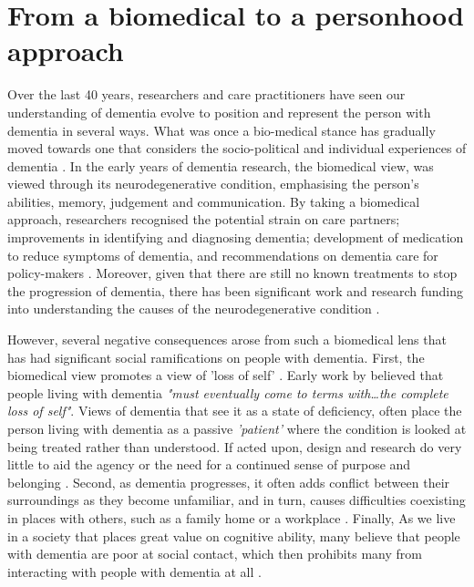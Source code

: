 \section{From a biomedical to a personhood approach}
\label{BL:DementiaHCI}
Over the last 40 years, researchers and care practitioners have seen our understanding of dementia evolve to position and represent the person with dementia in several ways. What was once a bio-medical stance has gradually moved towards one that considers the socio-political and individual experiences of dementia \citep{bellass_broadening_2019} . In the early years of dementia research, the biomedical view, was viewed through its neurodegenerative condition, emphasising the person's abilities, memory, judgement and communication. By taking a biomedical approach, researchers recognised the potential strain on care partners; improvements in identifying and diagnosing dementia; development of medication to reduce symptoms of dementia, and recommendations on dementia care for policy-makers \citep{doi:10.1080/13607863.2019.1693968}. Moreover, given that there are still no known treatments to stop the progression of dementia, there has been significant work and research funding into understanding the causes of the neurodegenerative condition \citep{bature_signs_2017}.

However, several negative consequences arose from such a biomedical lens that has had significant social ramifications on people with dementia. First, the biomedical view promotes a view of 'loss of self' \citep{ryan_dementia_2009}. Early work by \cite{cohen_loss_1986} believed that people living with dementia \textit{"must eventually come to terms with…the complete loss of self"}. Views of dementia that see it as a state of deficiency, often place the person living with dementia as a passive \textit{'patient'} where the condition is looked at being treated rather than understood. If acted upon, design and research do very little to aid the agency or the need for a continued sense of purpose and belonging \citep{hampson_dementia:_2016}. Second, as dementia progresses, it often adds conflict between their surroundings as they become unfamiliar, and in turn, causes difficulties coexisting in places with others, such as a family home or a workplace \citep{langdon_making_2007}. Finally, As we live in a society that places great value on cognitive ability, many believe that people with dementia are poor at social contact, which then prohibits many from interacting with people with dementia at all \citep{killick_communication_2001}.

